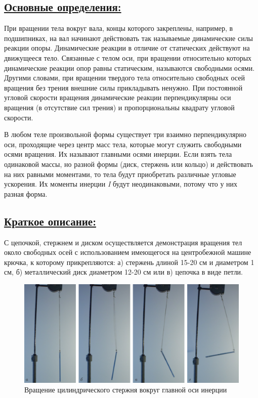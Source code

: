 \documentclass[14pt,a4paper,oneside]{extarticle}	%
\begin{document}
\subsection*{\underline{Основные определения:}}

%

При вращении тела вокруг вала, концы которого закреплены, например, в подшипниках, на вал начинают действовать так называемые динамические силы реакции опоры.
Динамические реакции в отличие от статических действуют на движущееся тело.
Связанные с телом оси, при вращении относительно которых динамические реакции опор равны статическим, называются свободными осями. Другими словами, при вращении твердого тела относительно свободных осей вращения без трения внешние силы прикладывать ненужно.
При постоянной угловой скорости вращения динамические реакции перпендикулярны оси вращения (в отсутствие сил трения) и пропорциональны квадрату угловой скорости.

В любом теле произвольной формы существует три взаимно перпендикулярно оси, проходящие через центр масс тела, которые могут служить свободными осями вращения.
Их называют главными осями инерции.
Если взять тела одинаковой массы, но разной формы (диск, стержень или кольцо) и действовать на них равными моментами, то тела будут приобретать различные угловые ускорения. 
Их моменты инерции \textit{I} будут неодинаковыми, потому что у них разная форма.

\subsection*{\underline{Краткое описание:}}

С цепочкой, стержнем и диском осуществляется демонстрация вращения тел около свободных осей с использованием имеющегося на центробежной машине крючка, к которому прикрепляются: а) стержень длиной 15-20 см и диаметром 1 см, б) металлический диск диаметром 12-20 см или в) цепочка в виде петли.
\begin{figure}[H] 
	\centering 		
	\includegraphics[width=0.8\linewidth]{freeaxis-2.png}
	\caption{Вращение цилиндрического стержня вокруг главной оси инерции}
	\label{freeaxis-2}
\end{figure}
\end{document}
